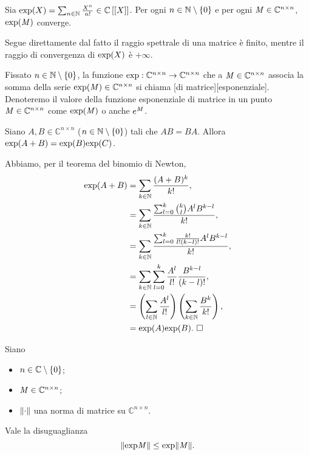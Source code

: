 \begin{Theorem}
	Sia
  $\text{exp}(X) =
  \sum_{n \in \mathbb{N}} \frac{X^n}{n!}
  \in \mathbb{C} \left [ \left [ X \right ] \right ]$. 
  Per ogni $n \in \mathbb{N} \setminus \lbrace 0 \rbrace$ e per ogni
  $\mathit{M} \in \mathbb{C}^{n \times n}$,
  $\text{exp}(\mathit{M})$ converge.
\end{Theorem}
\Proof Segue direttamente dal fatto il raggio spettrale di una matrice \`e
finito, mentre il raggio di convergenza di $\text{exp}(X)$ \`e $+\infty$.
\EndProof
\begin{Definition}
	Fissato $n \in \mathbb{N} \setminus \lbrace 0 \rbrace$, la funzione
  $\text{exp}: \mathbb{C}^{n \times n} \rightarrow \mathbb{C}^{n \times n}$
  che a
  $\mathit{M} \in \mathbb{C}^{n \times n}$ associa la somma della serie
  $\text{exp}(\mathit{M}) \in \mathbb{C}^{n \times n}$
  si chiama
  [di matrice][esponenziale].
  Denoteremo il valore della funzione esponenziale di matrice in un punto
  $\mathit{M} \in \mathbb{C}^{n \times n}$ come $\text{exp}(\mathit{M})$ o
  anche $e^{\mathit{M}}$.
\end{Definition}
\begin{Theorem}
  Siano $A, B \in \mathbb{C}^{n \times n}$ ($n \in \mathbb{N} \setminus \lbrace 0 \rbrace$) tali che $AB = BA$.
  Allora $\text{exp}(A + B) = \text{exp}(B) \text{exp}(C)$.
\end{Theorem}
\Proof Abbiamo, per il teorema del binomio di Newton,
\begin{align*}
  \text{exp}(A + B)
  &= \sum_{k \in \mathbb{N}} \frac{(A + B)^k}{k!},\\
  &= \sum_{k \in \mathbb{N}} \frac{\sum_{l = 0}^k \binom{k}{l} A^lB^{k - l}}{k!},\\
  &= \sum_{k \in \mathbb{N}} \frac{\sum_{l = 0}^k \frac{k!}{l!(k - l)!} A^lB^{k - l}}{k!},\\
  &= \sum_{k \in \mathbb{N}} \sum_{l = 0}^k \frac{A^l}{l!}\frac{B^{k - l}}{(k - l)!},\\
  &= \left ( \sum_{l \in \mathbb{N}} \frac{A^l}{l!} \right )
      \left ( \sum_{k \in \mathbb{N}} \frac{B^k}{k!} \right ),\\
  &= \text{exp}(A) \text{exp}(B).\text{ $\square$}
\end{align*}
\begin{Theorem}
  Siano
  \begin{itemize}
    \item $n \in \mathbb{C} \setminus \lbrace 0 \rbrace$;
    \item $\mathit{M} \in \mathbb{C}^{n \times n}$;
    \item $\Norm{\cdot}$ una norma di matrice su $\mathbb{C}^{n \times n}$.
  \end{itemize}
  Vale la disuguaglianza
  \[
    \Norm{\Exponential{\Matrix}} \leq \Exponential{\Norm{\Matrix}}.
  \]
\end{Theorem}
